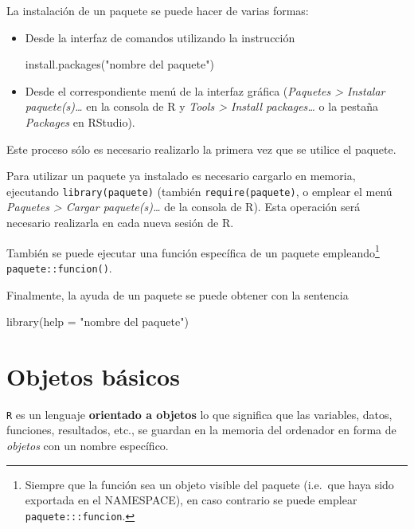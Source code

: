 \documentclass[
]{book}
\newenvironment{Shaded}{\begin{snugshade}}{\end{snugshade}}
\newcommand{\AttributeTok}[1]{\textcolor[rgb]{0.77,0.63,0.00}{#1}}
\newcommand{\FunctionTok}[1]{\textcolor[rgb]{0.00,0.00,0.00}{#1}}
\newcommand{\NormalTok}[1]{#1}
\newcommand{\StringTok}[1]{\textcolor[rgb]{0.31,0.60,0.02}{#1}}
\theoremstyle{break}
\theoremstyle{nonumberplain}
\begin{document}
La instalación de un paquete se puede hacer de varias formas:

\begin{itemize}
\item
  Desde la interfaz de comandos utilizando la instrucción

\begin{Shaded}
\begin{Highlighting}[]
\FunctionTok{install.packages}\NormalTok{(}\StringTok{"nombre del paquete"}\NormalTok{)}
\end{Highlighting}
\end{Shaded}
\item
  Desde el correspondiente menú de la interfaz gráfica (\emph{Paquetes \textgreater{} Instalar paquete(s)\ldots{}} en la consola de R y \emph{Tools \textgreater{} Install packages\ldots{}} o la pestaña \emph{Packages} en RStudio).
\end{itemize}

Este proceso sólo es necesario realizarlo la primera vez que se utilice el paquete.

Para utilizar un paquete ya instalado es necesario cargarlo en memoria, ejecutando \texttt{library(paquete)} (también \texttt{require(paquete)}, o emplear el menú \emph{Paquetes \textgreater{} Cargar paquete(s)\ldots{}} de la consola de R).
Esta operación será necesario realizarla en cada nueva sesión de R.

También se puede ejecutar una función específica de un paquete empleando\footnote{Siempre que la función sea un objeto visible del paquete (i.e.~que haya sido exportada en el NAMESPACE), en caso contrario se puede emplear \texttt{paquete:::funcion}.} \texttt{paquete::funcion()}.

Finalmente, la ayuda de un paquete se puede obtener con la sentencia

\begin{Shaded}
\begin{Highlighting}[]
\FunctionTok{library}\NormalTok{(}\AttributeTok{help =} \StringTok{"nombre del paquete"}\NormalTok{) }
\end{Highlighting}
\end{Shaded}

\hypertarget{objetos-buxe1sicos}{%
\section{Objetos básicos}\label{objetos-buxe1sicos}}

\texttt{R} es un lenguaje \textbf{orientado a objetos} lo que significa que las variables, datos, funciones, resultados, etc., se guardan en la memoria del ordenador en forma de \emph{objetos} con un nombre específico.
\end{document}

